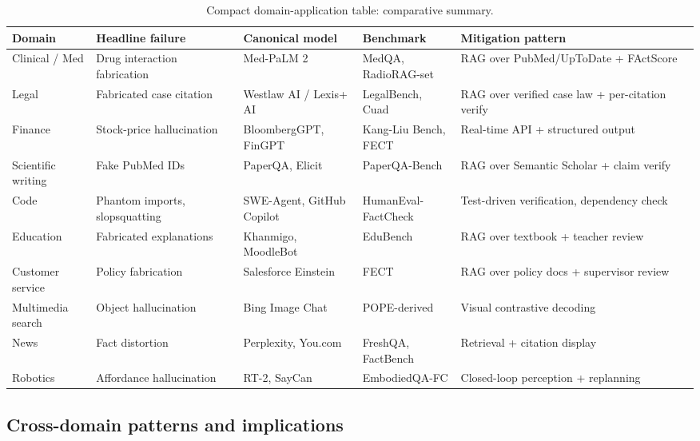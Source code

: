\documentclass{article}
\begin{document}
\begin{table}[t]
\centering
\caption{Compact domain-application table: comparative summary.}
\label{tab:compact-domain-application-table}
\begin{tabular}{>{\raggedright\arraybackslash}p{0.1277\linewidth}
  >{\raggedright\arraybackslash}p{0.2128\linewidth}
  >{\raggedright\arraybackslash}p{0.1773\linewidth}
  >{\raggedright\arraybackslash}p{0.1418\linewidth}
  >{\raggedright\arraybackslash}p{0.3404\linewidth}}
\toprule
Domain & Headline failure & Canonical model & Benchmark & Mitigation pattern \\
\midrule
Clinical / Med & Drug interaction fabrication & Med-PaLM 2 & MedQA, RadioRAG-set & RAG over PubMed/UpToDate + FActScore \\
Legal & Fabricated case citation & Westlaw AI / Lexis+ AI & LegalBench, Cuad & RAG over verified case law + per-citation verify \\
Finance & Stock-price hallucination & BloombergGPT, FinGPT & Kang-Liu Bench, FECT & Real-time API + structured output \\
Scientific writing & Fake PubMed IDs & PaperQA, Elicit & PaperQA-Bench & RAG over Semantic Scholar + claim verify \\
Code & Phantom imports, slopsquatting & SWE-Agent, GitHub Copilot & HumanEval-FactCheck & Test-driven verification, dependency check \\
Education & Fabricated explanations & Khanmigo, MoodleBot & EduBench & RAG over textbook + teacher review \\
Customer service & Policy fabrication & Salesforce Einstein & FECT & RAG over policy docs + supervisor review \\
Multimedia search & Object hallucination & Bing Image Chat & POPE-derived & Visual contrastive decoding \\
News & Fact distortion & Perplexity, You.com & FreshQA, FactBench & Retrieval + citation display \\
Robotics & Affordance hallucination & RT-2, SayCan & EmbodiedQA-FC & Closed-loop perception + replanning \\
\end{tabular}
\end{table}

\subsection{Cross-domain patterns and implications}\label{cross-domain-patterns-and-implications}
\end{document}
